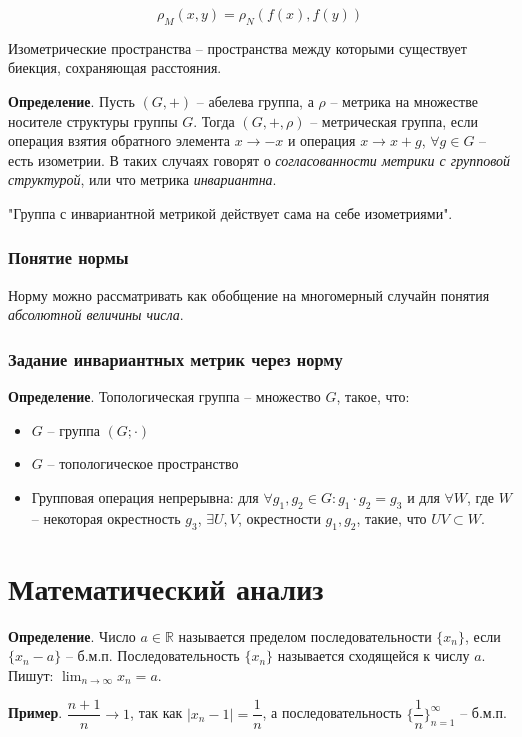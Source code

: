 \documentclass[a4paper]{book}
\begin{document}
\begin{equation}
\rho_M(x,y) = \rho_N(f(x),f(y))
\end{equation}

Изометрические пространства -- пространства между которыми существует биекция, сохраняющая расстояния. 

\textbf{Определение}. Пусть $(G,+)$ -- абелева группа, а $\rho$ -- метрика на множестве носителе структуры группы $G$. Тогда $(G,+,\rho)$ -- метрическая группа, если операция взятия обратного элемента $x\rightarrow -x$ и операция $x \rightarrow x+g$, $\forall g\in G$ -- есть изометрии. В таких случаях говорят о \textit{согласованности метрики с групповой структурой}, или что метрика \textit{инвариантна}.

"Группа с инвариантной метрикой действует сама на себе изометриями". 


\subsection{Понятие нормы}
Норму можно рассматривать как обобщение на многомерный случайн понятия \textit{абсолютной величины числа}. 


\subsection{Задание инвариантных метрик через норму}


\textbf{Определение}. Топологическая группа -- множество $G$, такое, что:
\begin{itemize}
	\item $G$ -- группа $(G;\cdot)$
	\item $G$ -- топологическое пространство 
	\item Групповая операция непрерывна: для $\forall g_1, g_2\in G: g_1\cdot g_2 = g_3$ и для $\forall W$, где $W$ -- некоторая окрестность $g_3$, $\exists U,V$, окрестности $g_1,g_2$, такие, что $UV\subset W$. 
\end{itemize}

\chapter{Математический анализ}
\textbf{Определение}. Число $a\in\mathbb{R}$ называется пределом последовательности $\{x_n\}$, если $\{x_n-a\}$ -- б.м.п. Последовательность $\{x_n\}$ называется сходящейся к числу $a$. Пишут: $\lim_{n\rightarrow\infty} x_n = a$. 

\textbf{Пример}. $\dfrac{n+1}{n}\rightarrow 1$, так как $| x_n - 1 | = \dfrac{1}{n}$, а последовательность $\{\dfrac{1}{n}\}^{\infty}_{n=1}$ -- б.м.п.
\end{document}
